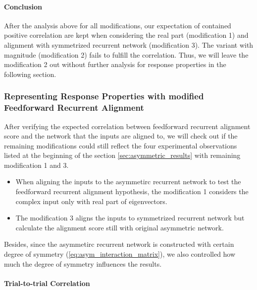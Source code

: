 \documentclass[11pt]{article}
\begin{document}
	\paragraph{Conclusion} After the analysis above for all modifications, our expectation of contained positive correlation are kept when considering the real part (modification 1) and alignment with symmetrized recurrent network (modification 3). The variant with magnitude (modification 2) fails to fulfill the correlation. Thus, we will leave the modification 2 out without further analysis for response properties in the following section. 
	
	\subsubsection{Representing Response Properties with modified Feedforward Recurrent Alignment}
	
	After verifying the expected correlation between feedforward recurrent alignment score and the network that the inputs are aligned to, we will check out if the remaining modifications could still reflect the four experimental observations listed at the beginning of the section \ref{sec:asymmetric_results} with remaining modification 1 and 3. 
	\begin{itemize}
		\item When aligning the inputs to the asymmetirc recurrent network to test the feedforward recurrent alignment hypothesis, the modification 1 considers the complex input only with real part of eigenvectors. 
		\item The modification 3 aligns the inputs to symmetrized recurrent network but calculate the alignment score still with original asymmetric network. 
	\end{itemize}
	
	Besides, since the asymmetirc recurrent network is constructed with certain degree of symmetry (\ref{eq:asym_interaction_matrix}), we also controlled how much the degree of symmetry influences the results. 
	
	\paragraph{Trial-to-trial Correlation}
	
\end{document}
